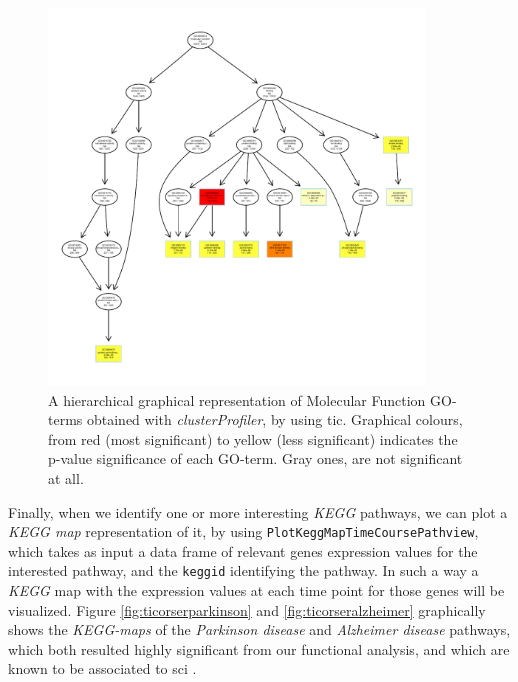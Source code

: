 \begin{figure}[H]
\centering
\includegraphics[width=10cm, keepaspectratio]{img/ticorser/functional/mf_hier.pdf}
\caption[ticorser hierarchial GO-terms]{A hierarchical graphical representation of Molecular Function GO-terms obtained with \textit{clusterProfiler}, by using \gls{tic}.
Graphical colours, from red (most significant) to yellow (less significant) indicates the p-value significance of each GO-term. 
Gray ones, are not significant at all.}
\label{fig:ticorsergo}
\end{figure}

Finally, when we identify one or more interesting \textit{KEGG} pathways, we can plot a \textit{KEGG map} representation of it, by using \lstinline!PlotKeggMapTimeCoursePathview!, which takes as input a data frame of relevant genes expression values for the interested pathway, and the \lstinline!keggid! identifying the pathway. 
In such a way a \textit{KEGG} map with the expression values at each time point for those genes will be visualized.
Figure \ref{fig:ticorserparkinson} and \ref{fig:ticorseralzheimer} graphically shows the \textit{KEGG-maps} of the \textit{Parkinson disease} and \textit{Alzheimer disease} pathways, which both resulted highly significant from our functional analysis, and which are known to be associated to \gls{sci} \cite{Yeh2016, Yeh2018}.

